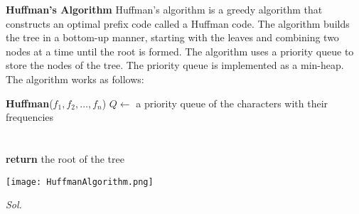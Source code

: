 \textbf{Huffman's Algorithm}
Huffman's algorithm is a greedy algorithm that constructs an optimal prefix code called a Huffman code. The algorithm builds the tree in a bottom-up manner, starting with the leaves and combining two nodes at a time until the root is formed. The algorithm uses a priority queue to store the nodes of the tree. The priority queue is implemented as a min-heap. The algorithm works as follows:

\begin{algorithmic}
	\State \textbf{Huffman}($f_1, f_2, \ldots, f_n$)
	\State $Q \gets$ a priority queue of the characters with their frequencies \\
	 \\
	 \\
	\State \textbf{return} the root of the tree
\end{algorithmic}

\texttt{[image: HuffmanAlgorithm.png]} 

\textit{ Sol. }


